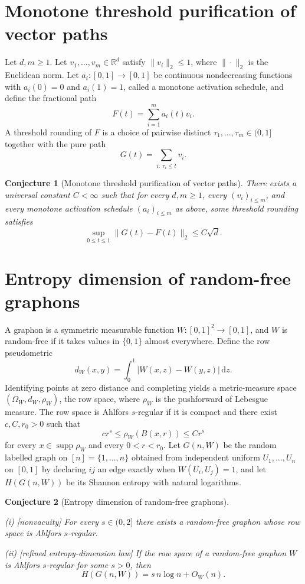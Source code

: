 \documentclass[11pt]{article}
\newtheorem{conjecture}{Conjecture}
\theoremstyle{definition}
\newcommand{\R}{\mathbb R}
\providecommand{\R}{\mathbb R}
\begin{document}
\section{Monotone threshold purification of vector paths}

Let $d,m\ge1$.  Let $v_1,\ldots,v_m\in\R^d$ satisfy $\|v_i\|_2\le1$,
where $\|\cdot\|_2$ is the Euclidean norm.  Let
$a_i:[0,1]\to[0,1]$ be continuous nondecreasing functions with
$a_i(0)=0$ and $a_i(1)=1$, called a monotone activation schedule, and
define the fractional path
\[
F(t)=\sum_{i=1}^m a_i(t)v_i.
\]
A threshold rounding of $F$ is a choice of pairwise distinct
$\tau_1,\ldots,\tau_m\in(0,1]$ together with the pure path
\[
G(t)=\sum_{i:\ \tau_i\le t}v_i .
\]

\begin{conjecture}[Monotone threshold purification of vector paths]\label{t2}
There exists a universal constant $C<\infty$ such that for every
$d,m\ge1$, every $(v_i)_{i\le m}$, and every monotone activation
schedule $(a_i)_{i\le m}$ as above, some threshold rounding satisfies
\[
\sup_{0\le t\le1}\|G(t)-F(t)\|_2\le C\sqrt d .
\]
\end{conjecture}


\section{Entropy dimension of random-free graphons}

A graphon is a symmetric measurable function
$W:[0,1]^2\to[0,1]$, and $W$ is random-free if it takes values in
$\{0,1\}$ almost everywhere.  Define the row pseudometric
\[
d_W(x,y)=\int_0^1|W(x,z)-W(y,z)|\,\mathrm dz .
\]
Identifying points at zero distance and completing yields a
metric-measure space $(\Omega_W,d_W,\rho_W)$, the row space, where
$\rho_W$ is the pushforward of Lebesgue measure.  The row space is
Ahlfors $s$-regular if it is compact and there exist
$c,C,r_0>0$ such that
\[
cr^s\le\rho_W(B(x,r))\le Cr^s
\]
for every $x\in\operatorname{supp}\rho_W$ and every $0<r<r_0$.  Let
$G(n,W)$ be the random labelled graph on $[n]=\{1,\ldots,n\}$ obtained
from independent uniform $U_1,\ldots,U_n$ on $[0,1]$ by declaring
$ij$ an edge exactly when $W(U_i,U_j)=1$, and let $H(G(n,W))$ be its
Shannon entropy with natural logarithms.

\begin{conjecture}[Entropy dimension of random-free graphons]\label{t3}
\leavevmode

\emph{(i)} \textup{[nonvacuity]}  For every $s\in(0,2]$ there exists a
random-free graphon whose row space is Ahlfors $s$-regular.

\emph{(ii)} \textup{[refined entropy-dimension law]}  If the row space of a
random-free graphon $W$ is Ahlfors $s$-regular for some $s>0$, then
\[
H(G(n,W))=s\,n\log n+O_W(n) .
\]

\end{conjecture}
\end{document}
